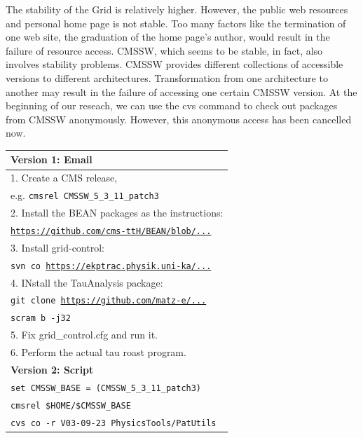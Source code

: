 \documentclass{acm_proc_article-sp}
\begin{document}
The stability of the Grid is relatively higher. However, the
public web resources and personal home page is not stable. Too many factors
like the termination of one web site, the graduation of the home page's author,
would result in the failure of resource access. CMSSW, which seems to be
stable, in fact, also involves stability problems. CMSSW provides different
collections of accessible versions to different architectures. Transformation
from one architecture to another may result in the failure of accessing one
certain CMSSW version. At the beginning of our reseach, we can use the cvs command to
check out packages from CMSSW anonymously. However, this anonymous access has
been cancelled now.

\begin{table}
    \centering
    \begin{tabular}{|l|}
        \hline
        {\bf Version 1: Email}\\ \hline
        1. Create a CMS release,\\
            \hspace{9pt} e.g. {\tt cmsrel CMSSW\_5\_3\_11\_patch3} \\
        2. Install the BEAN packages as the instructions: \\
            \hspace{9pt} {\tt \url{https://github.com/cms-ttH/BEAN/blob/...}}\\
        3. Install grid-control: \\ 
            \hspace{9pt} {\tt svn co \url{https://ekptrac.physik.uni-ka/...}} \\
        4. INstall the TauAnalysis package: \\
           \hspace{9pt} {\tt git clone \url{https://github.com/matz-e/...}} \\
           \hspace{9pt} {\tt scram b -j32} \\
        5. Fix grid\_control.cfg and run it. \\
        6. Perform the actual tau roast program. \\ 
        \hline
        {\bf Version 2: Script}\\ \hline
        {\tt set CMSSW\_BASE = (CMSSW\_5\_3\_11\_patch3)} \\
        {\tt cmsrel \$HOME/\$CMSSW\_BASE} \\
        {\tt cvs co -r V03-09-23 PhysicsTools/PatUtils} \\

\end{tabular}
\end{table}
\end{document}
